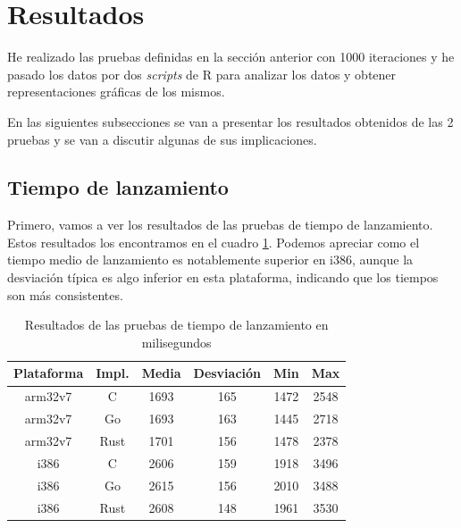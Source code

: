 \section{Resultados}

He realizado las pruebas definidas en la sección anterior con 1000 iteraciones y
he pasado los datos por dos \textit{scripts} de R para analizar los datos y
obtener representaciones gráficas de los mismos.

En las siguientes subsecciones se van a presentar los resultados obtenidos de
las 2 pruebas y se van a discutir algunas de sus implicaciones.

\subsection{Tiempo de lanzamiento}

Primero, vamos a ver los resultados de las pruebas de tiempo de lanzamiento.
Estos resultados los encontramos en el cuadro \ref{tab:start-results}. Podemos
apreciar como el tiempo medio de lanzamiento es notablemente superior en i386,
aunque la desviación típica es algo inferior en esta plataforma, indicando que
los tiempos son más consistentes.

\begin{table}[h!]
    \caption{Resultados de las pruebas de tiempo de lanzamiento en milisegundos}
    \label{tab:start-results}
    \begin{center}
        \begin{tabular}{ |c|c|c|c|c|c| }
            \hline
            \textbf{Plataforma} & \textbf{Impl.} & \textbf{Media} &
            \textbf{Desviación} & \textbf{Min}   & \textbf{Max}           \\
            \hline
            arm32v7             & C              & 1693           &
            165                 & 1472           & 2548                   \\
            \hline
            arm32v7             & Go             & 1693           & 163 &
            1445                & 2718                                    \\
            \hline
            arm32v7             & Rust           & 1701           & 156 &
            1478                & 2378                                    \\
            \hline
            i386                & C              & 2606           &
            159                 & 1918           & 3496                   \\
            \hline
            i386                & Go             & 2615           & 156 &
            2010                & 3488                                    \\
            \hline
            i386                & Rust           & 2608           & 148 &
            1961                & 3530                                    \\
            \hline
        \end{tabular}
    \end{center}
\end{table}

